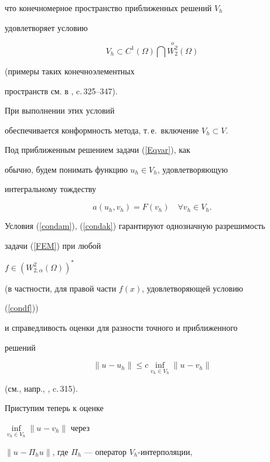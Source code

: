 что конечномерное пространство приближенных решений $V_h$ 


удовлетворяет условию


$$


V_h \subset C^1(\Omega) \bigcap \overset{o}{W^2_2}{}(\Omega)


$$


(примеры таких конечноэлементных 


пространств см. в \cite{Ciarle}, c.\,325--347).


При выполнении этих условий


обеспечивается конформность метода, т.\,е.~включение $V_h \subset V$.





Под приближенным решением задачи (\ref{Eqvar}), как


обычно, будем понимать функцию $u_h \in V_h$, удовлетворяющую


интегральному тождеству


\begin{equation} \label{FEM} 


a(u_h,v_h)=F(v_h) \quad \forall v_h \in V_h.


\end{equation}


Условия (\ref{condam}), (\ref{condak}) гарантируют однозначную разрешимость 


задачи (\ref{FEM}) при любой 


$f \in ( { W_{2,\alpha }^2( \Omega )} )^* $ 


(в частности, для правой части $f(x)$, удовлетворяющей условию


(\ref{condf}))


и справедливость оценки для разности точного и приближенного


решений


\begin{equation} \label{EstErr} 


\| {u_{}-u_h} \| \le c\mathop {\inf }\limits_{v_h\in V_h}\| {u_{}-v_h} \|


\end{equation}


(см., напр., \cite{Ciarle}, c.\,315).





Приступим теперь к оценке


$\underset{v_h\in V_h}{\inf}{}\| {u_{}-v_h}\|$ через


$\| {u_{}-\Pi_h u}\|$, где $\Pi_h$ --- оператор $V_h$-интерполяции, 


